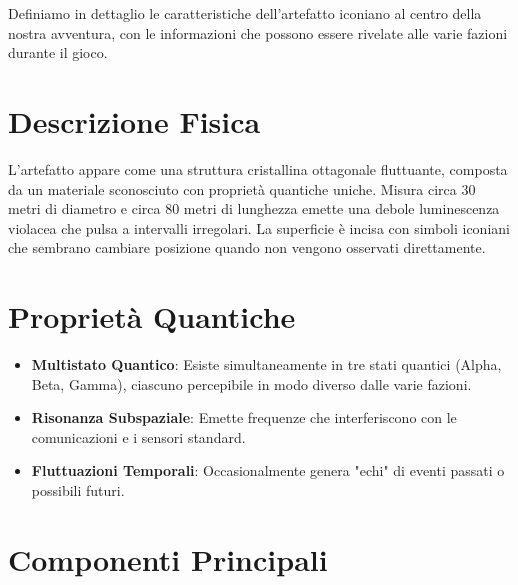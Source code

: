 \documentclass[letterpaper,twocolumn,openany,nodeprecatedcode]{dndbook}
\begin{document}
Definiamo in dettaglio le caratteristiche dell'artefatto iconiano al centro della nostra avventura, con le informazioni che possono essere rivelate alle varie fazioni durante il gioco.

\section{Descrizione Fisica}

L'artefatto appare come una struttura cristallina ottagonale fluttuante, composta da un materiale sconosciuto con proprietà quantiche uniche. Misura circa 30 metri di diametro e circa 80 metri di lunghezza emette una debole luminescenza violacea che pulsa a intervalli irregolari. La superficie è incisa con simboli iconiani che sembrano cambiare posizione quando non vengono osservati direttamente.

\section{Proprietà Quantiche}

\begin{itemize}
    \item \textbf{Multistato Quantico}: Esiste simultaneamente in tre stati quantici (Alpha, Beta, Gamma), ciascuno percepibile in modo diverso dalle varie fazioni.
    \item \textbf{Risonanza Subspaziale}: Emette frequenze che interferiscono con le comunicazioni e i sensori standard.
    \item \textbf{Fluttuazioni Temporali}: Occasionalmente genera "echi" di eventi passati o possibili futuri.
\end{itemize}

\section{Componenti Principali}
\end{document}
